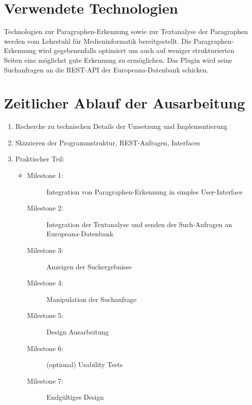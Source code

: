 \documentclass{llncs}
\begin{document}
\section{Verwendete Technologien}
Technologien zur Paragraphen-Erkennung sowie zur Textanalyse der Paragraphen werden vom Lehrstuhl für Medieninformatik bereitgestellt. Die Paragraphen-Erkennung wird gegebenenfalls optimiert um auch auf weniger strukturierten Seiten eine möglichst gute Erkennung zu ermöglichen.
\newline
Das Plugin wird seine Suchanfragen an die REST-API der Europeana-Datenbank schicken.

\section{Zeitlicher Ablauf der Ausarbeitung}
\begin{enumerate}[label=\Roman*)]
\item Recherche zu technischen Details der Umsetzung und Implementierung
\item Skizzieren der Programmstruktur, REST-Anfragen, Interfaces
\item Praktischer Teil:
\begin{itemize}
\item[]
\begin{description}
\item [Milestone 1:] Integration von Paragraphen-Erkennung in simples User-Interface
\item [Milestone 2:] Integration der Textanalyse und senden der Such-Anfragen an Europeana-Datenbank
\item [Milestone 3:] Anzeigen der Suchergebnisse 
\item [Milestone 4:] Manipulation der Suchanfrage
\item [Milestone 5:] Design Ausarbeitung
\item [Milestone 6:] (optional) Usability Tests
\item [Milestone 7:] Endgültiges Design 
\end{description}
\end{itemize}


\end{enumerate}
\end{document}
